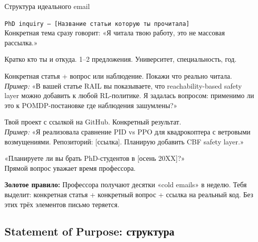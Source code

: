 \documentclass[10pt, a4paper]{article}
\begin{document}
\begin{stratbox}{Структура идеального email}
\begin{description}[leftmargin=2em, style=nextline]
  \item[\textbf{Тема письма:}] \texttt{PhD inquiry — [Название статьи которую ты прочитала]}\\
    Конкретная тема сразу говорит: «Я читала твою работу, это не массовая рассылка.»
  \item[\textbf{Абзац 1:}] Кратко кто ты и откуда. 1–2 предложения. Университет, специальность, год.
  \item[\textbf{Абзац 2:}] Конкретная статья + вопрос или наблюдение. Покажи что реально читала.\\
    \textit{Пример:} «В вашей статье RAIL вы показываете, что reachability-based safety layer можно добавить к любой RL-политике. Я задалась вопросом: применимо ли это к POMDP-постановке где наблюдения зашумлены?»
  \item[\textbf{Абзац 3:}] Твой проект с ссылкой на GitHub. Конкретный результат.\\
    \textit{Пример:} «Я реализовала сравнение PID vs PPO для квадрокоптера с ветровыми возмущениями. Репозиторий: [ссылка]. Планирую добавить CBF safety layer.»
  \item[\textbf{Финал:}] «Планируете ли вы брать PhD-студентов в [осень 20XX]?»\\
    Прямой вопрос уважает время профессора.
\end{description}
\end{stratbox}

\vspace{4pt}

\begin{tipbox}
\textbf{Золотое правило:} Профессора получают десятки «cold emails» в неделю. Тебя выделит: конкретная статья + конкретный вопрос + ссылка на реальный код. Без этих трёх элементов письмо теряется.
\end{tipbox}

\subsection{Statement of Purpose: структура}
\end{document}
